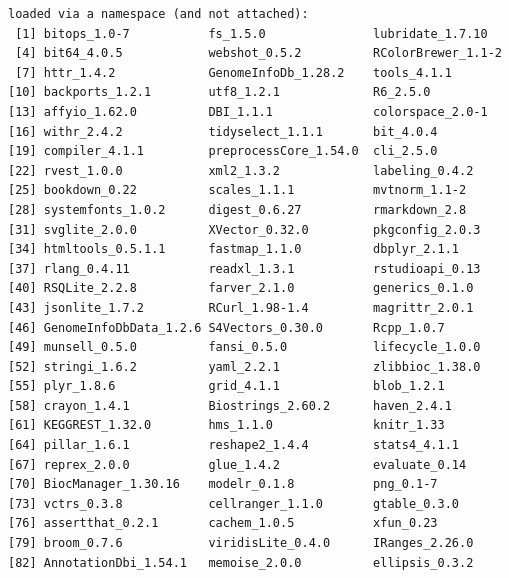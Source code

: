 \documentclass[
]{article}
\begin{document}
\begin{verbatim}
loaded via a namespace (and not attached):
 [1] bitops_1.0-7           fs_1.5.0               lubridate_1.7.10      
 [4] bit64_4.0.5            webshot_0.5.2          RColorBrewer_1.1-2    
 [7] httr_1.4.2             GenomeInfoDb_1.28.2    tools_4.1.1           
[10] backports_1.2.1        utf8_1.2.1             R6_2.5.0              
[13] affyio_1.62.0          DBI_1.1.1              colorspace_2.0-1      
[16] withr_2.4.2            tidyselect_1.1.1       bit_4.0.4             
[19] compiler_4.1.1         preprocessCore_1.54.0  cli_2.5.0             
[22] rvest_1.0.0            xml2_1.3.2             labeling_0.4.2        
[25] bookdown_0.22          scales_1.1.1           mvtnorm_1.1-2         
[28] systemfonts_1.0.2      digest_0.6.27          rmarkdown_2.8         
[31] svglite_2.0.0          XVector_0.32.0         pkgconfig_2.0.3       
[34] htmltools_0.5.1.1      fastmap_1.1.0          dbplyr_2.1.1          
[37] rlang_0.4.11           readxl_1.3.1           rstudioapi_0.13       
[40] RSQLite_2.2.8          farver_2.1.0           generics_0.1.0        
[43] jsonlite_1.7.2         RCurl_1.98-1.4         magrittr_2.0.1        
[46] GenomeInfoDbData_1.2.6 S4Vectors_0.30.0       Rcpp_1.0.7            
[49] munsell_0.5.0          fansi_0.5.0            lifecycle_1.0.0       
[52] stringi_1.6.2          yaml_2.2.1             zlibbioc_1.38.0       
[55] plyr_1.8.6             grid_4.1.1             blob_1.2.1            
[58] crayon_1.4.1           Biostrings_2.60.2      haven_2.4.1           
[61] KEGGREST_1.32.0        hms_1.1.0              knitr_1.33            
[64] pillar_1.6.1           reshape2_1.4.4         stats4_4.1.1          
[67] reprex_2.0.0           glue_1.4.2             evaluate_0.14         
[70] BiocManager_1.30.16    modelr_0.1.8           png_0.1-7             
[73] vctrs_0.3.8            cellranger_1.1.0       gtable_0.3.0          
[76] assertthat_0.2.1       cachem_1.0.5           xfun_0.23             
[79] broom_0.7.6            viridisLite_0.4.0      IRanges_2.26.0        
[82] AnnotationDbi_1.54.1   memoise_2.0.0          ellipsis_0.3.2        
\end{verbatim}
\end{document}
